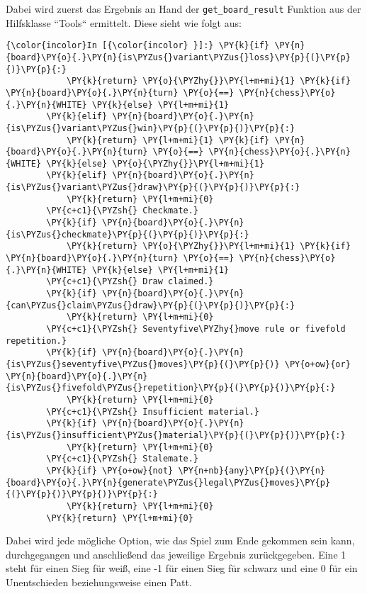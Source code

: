     Dabei wird zuerst das Ergebnis an Hand der \texttt{get\_board\_result}
Funktion aus der Hilfsklasse ``Tools`` ermittelt. Diese sieht wie folgt
aus:

    \begin{Verbatim}[commandchars=\\\{\}]
{\color{incolor}In [{\color{incolor} }]:} \PY{k}{if} \PY{n}{board}\PY{o}{.}\PY{n}{is\PYZus{}variant\PYZus{}loss}\PY{p}{(}\PY{p}{)}\PY{p}{:}
            \PY{k}{return} \PY{o}{\PYZhy{}}\PY{l+m+mi}{1} \PY{k}{if} \PY{n}{board}\PY{o}{.}\PY{n}{turn} \PY{o}{==} \PY{n}{chess}\PY{o}{.}\PY{n}{WHITE} \PY{k}{else} \PY{l+m+mi}{1}
        \PY{k}{elif} \PY{n}{board}\PY{o}{.}\PY{n}{is\PYZus{}variant\PYZus{}win}\PY{p}{(}\PY{p}{)}\PY{p}{:}
            \PY{k}{return} \PY{l+m+mi}{1} \PY{k}{if} \PY{n}{board}\PY{o}{.}\PY{n}{turn} \PY{o}{==} \PY{n}{chess}\PY{o}{.}\PY{n}{WHITE} \PY{k}{else} \PY{o}{\PYZhy{}}\PY{l+m+mi}{1}
        \PY{k}{elif} \PY{n}{board}\PY{o}{.}\PY{n}{is\PYZus{}variant\PYZus{}draw}\PY{p}{(}\PY{p}{)}\PY{p}{:}
            \PY{k}{return} \PY{l+m+mi}{0}
        \PY{c+c1}{\PYZsh{} Checkmate.}
        \PY{k}{if} \PY{n}{board}\PY{o}{.}\PY{n}{is\PYZus{}checkmate}\PY{p}{(}\PY{p}{)}\PY{p}{:}
            \PY{k}{return} \PY{o}{\PYZhy{}}\PY{l+m+mi}{1} \PY{k}{if} \PY{n}{board}\PY{o}{.}\PY{n}{turn} \PY{o}{==} \PY{n}{chess}\PY{o}{.}\PY{n}{WHITE} \PY{k}{else} \PY{l+m+mi}{1}
        \PY{c+c1}{\PYZsh{} Draw claimed.}
        \PY{k}{if} \PY{n}{board}\PY{o}{.}\PY{n}{can\PYZus{}claim\PYZus{}draw}\PY{p}{(}\PY{p}{)}\PY{p}{:}
            \PY{k}{return} \PY{l+m+mi}{0}
        \PY{c+c1}{\PYZsh{} Seventyfive\PYZhy{}move rule or fivefold repetition.}
        \PY{k}{if} \PY{n}{board}\PY{o}{.}\PY{n}{is\PYZus{}seventyfive\PYZus{}moves}\PY{p}{(}\PY{p}{)} \PY{o+ow}{or} \PY{n}{board}\PY{o}{.}\PY{n}{is\PYZus{}fivefold\PYZus{}repetition}\PY{p}{(}\PY{p}{)}\PY{p}{:}
            \PY{k}{return} \PY{l+m+mi}{0}
        \PY{c+c1}{\PYZsh{} Insufficient material.}
        \PY{k}{if} \PY{n}{board}\PY{o}{.}\PY{n}{is\PYZus{}insufficient\PYZus{}material}\PY{p}{(}\PY{p}{)}\PY{p}{:}
            \PY{k}{return} \PY{l+m+mi}{0}
        \PY{c+c1}{\PYZsh{} Stalemate.}
        \PY{k}{if} \PY{o+ow}{not} \PY{n+nb}{any}\PY{p}{(}\PY{n}{board}\PY{o}{.}\PY{n}{generate\PYZus{}legal\PYZus{}moves}\PY{p}{(}\PY{p}{)}\PY{p}{)}\PY{p}{:}
            \PY{k}{return} \PY{l+m+mi}{0}
        \PY{k}{return} \PY{l+m+mi}{0}
\end{Verbatim}

    Dabei wird jede mögliche Option, wie das Spiel zum Ende gekommen sein
kann, durchgegangen und anschließend das jeweilige Ergebnis
zurückgegeben. Eine 1 steht für einen Sieg für weiß, eine -1 für einen
Sieg für schwarz und eine 0 für ein Unentschieden beziehungsweise einen
Patt.

